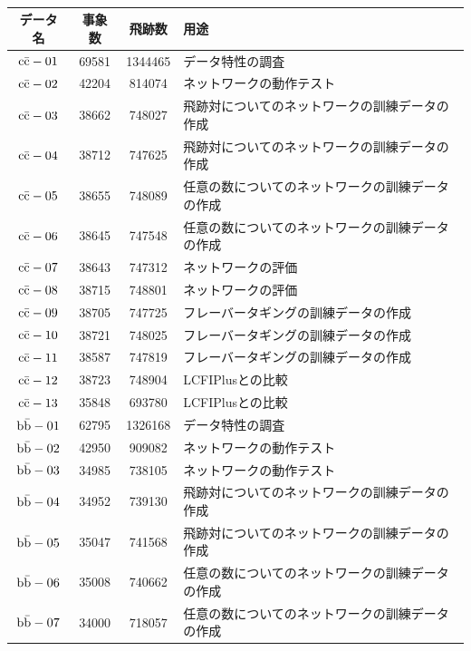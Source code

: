 \begin{table}[htb]
 \centering
　\small
  \begin{tabular}{c c c l} \hline
     データ名 & 事象数 & 飛跡数 & 用途\\ \hline \hline
    $\rm c\bar{c}-01$ & 69581 & 1344465 & データ特性の調査\\ \hline
    $\rm c\bar{c}-02$ & 42204 & 814074 & ネットワークの動作テスト\\ \hline
    $\rm c\bar{c}-03$ & 38662 & 748027 & 飛跡対についてのネットワークの訓練データの作成\\
    $\rm c\bar{c}-04$ & 38712 & 747625 & 飛跡対についてのネットワークの訓練データの作成\\ \hline
    $\rm c\bar{c}-05$ & 38655 & 748089 & 任意の数についてのネットワークの訓練データの作成\\
    $\rm c\bar{c}-06$ & 38645 & 747548 & 任意の数についてのネットワークの訓練データの作成\\ \hline
    $\rm c\bar{c}-07$ & 38643 & 747312 & ネットワークの評価\\
    $\rm c\bar{c}-08$ & 38715 & 748801 & ネットワークの評価\\ \hline 
    $\rm c\bar{c}-09$ & 38705 & 747725 & フレーバータギングの訓練データの作成\\ 
    $\rm c\bar{c}-10$ & 38721 & 748025 & フレーバータギングの訓練データの作成\\
    $\rm c\bar{c}-11$ & 38587 & 747819 & フレーバータギングの訓練データの作成\\ \hline
    $\rm c\bar{c}-12$ & 38723 & 748904 & LCFIPlusとの比較\\
    $\rm c\bar{c}-13$ & 35848 & 693780 & LCFIPlusとの比較\\ \hline\hline
    $\rm b\bar{b}-01$ & 62795 & 1326168 & データ特性の調査\\ \hline
    $\rm b\bar{b}-02$ & 42950 & 909082 & ネットワークの動作テスト\\
    $\rm b\bar{b}-03$ & 34985 & 738105 & ネットワークの動作テスト\\ \hline
    $\rm b\bar{b}-04$ & 34952 & 739130 & 飛跡対についてのネットワークの訓練データの作成\\ 
    $\rm b\bar{b}-05$ & 35047 & 741568 & 飛跡対についてのネットワークの訓練データの作成\\ \hline
    $\rm b\bar{b}-06$ & 35008 & 740662 & 任意の数についてのネットワークの訓練データの作成\\ 
    $\rm b\bar{b}-07$ & 34000 & 718057 & 任意の数についてのネットワークの訓練データの作成\\ \hline

\end{tabular}
\end{table}
